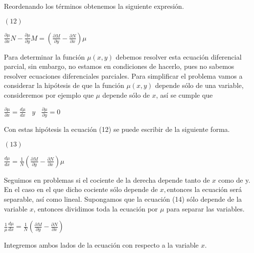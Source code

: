 \documentclass[l etterpaper,11pt]{article}
\begin{document}
Reordenando los términos obtenemos la siguiente expresión.
\begin{flushleft} 
$(12)$
\end{flushleft}

\begin{center}

$\frac{\partial\mu}{\partial x}N-\frac{\partial\mu}{\partial y}M=(\frac{\partial M}{\partial y}-\frac{\partial N}{\partial x})\mu$\\
\end{center}


Para determinar la función $\mu\left(x,y\right)$ debemos resolver esta ecuación diferencial parcial, sin embargo, no estamos en condiciones de hacerlo, pues no sabemos resolver ecuaciones diferenciales parciales. Para simplificar el problema vamos a considerar la hipótesis de que la función $  \mu\left(x,y\right) $ depende sólo de una variable, consideremos por ejemplo que $\mu$ depende sólo de $ x$, así se cumple que
\begin{center}

$\frac{\partial\mu}{\partial x}=\frac{d\mu}{dx}\ \ \ \ y\ \ \ \ \frac{\partial\mu}{\partial y}=0$\\
\end{center}

Con estas hipótesis la ecuación (12) se puede escribir de la siguiente forma.
\begin{flushleft} 
$(13)$
\end{flushleft}

\begin{center}

$\frac{d\mu}{dx}=\frac{1}{N}(\frac{\partial M}{\partial y}-\frac{\partial N}{\partial x})\mu$\\
\end{center}

Seguimos en problemas si el cociente de la derecha depende tanto de $ x$ como de y. En el caso en el que dicho cociente sólo depende de $ x, $entonces la ecuación será separable, así como lineal.
Supongamos que la ecuación (14) sólo depende de la variable $ x $, entonces dividimos toda la ecuación por $ \mu $ para separar las variables.
\begin{center}

$\frac{1}{\mu}\frac{d\mu}{dx}=\frac{1}{N}(\frac{\partial M}{\partial y}-\frac{\partial N}{\partial x})$\\
\end{center}

Integremos ambos lados de la ecuación con respecto a la variable $ x $.
\end{document}
